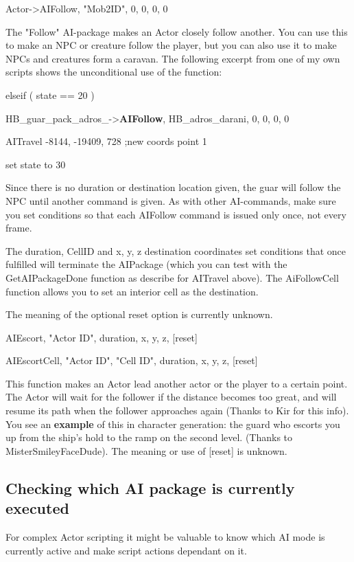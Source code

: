 \documentclass[
]{article}
\begin{document}
Actor-\textgreater AIFollow, "Mob2ID", 0, 0, 0, 0

The "Follow" AI-package makes an Actor closely follow another. You can
use this to make an NPC or creature follow the player, but you can also
use it to make NPCs and creatures form a caravan. The following excerpt
from one of my own scripts shows the unconditional use of the function:

elseif ( state == 20 )

HB\_guar\_pack\_adros\_-\textgreater{}\textbf{AIFollow},
HB\_adros\_darani, 0, 0, 0, 0

AITravel -8144, -19409, 728 ;new coords point 1

set state to 30

Since there is no duration or destination location given, the guar will
follow the NPC until another command is given. As with other
AI-commands, make sure you set conditions so that each AIFollow command
is issued only once, not every frame.

The duration, CellID and x, y, z destination coordinates set conditions
that once fulfilled will terminate the AIPackage (which you can test
with the GetAIPackageDone function as describe for AITravel above). The
AiFollowCell function allows you to set an interior cell as the
destination.

The meaning of the optional reset option is currently unknown.

AIEscort, "Actor ID", duration, x, y, z, {[}reset{]}

AIEscortCell, "Actor ID", "Cell ID", duration, x, y, z, {[}reset{]}

This function makes an Actor lead another actor or the player to a
certain point. The Actor will wait for the follower if the distance
becomes too great, and will resume its path when the follower approaches
again (Thanks to Kir for this info). You see an \textbf{example} of this
in character generation: the guard who escorts you up from the ship's
hold to the ramp on the second level. (Thanks to MisterSmileyFaceDude).
The meaning or use of {[}reset{]} is unknown.

\hypertarget{checking-which-ai-package-is-currently-executed}{%
\subsection{Checking which AI package is currently
executed}\label{checking-which-ai-package-is-currently-executed}}

For complex Actor scripting it might be valuable to know which AI mode
is currently active and make script actions dependant on it.
\end{document}
